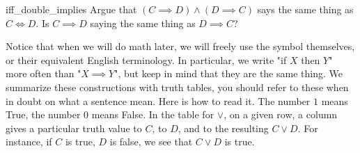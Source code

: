 \begin{cex}{}{iff_double_implies}
    Argue that \( (C \implies D) \land (D \implies C) \) says the same thing as \( C \iff D \). Is \( C \implies D \) saying the same thing as \(  D \implies C \)?
\end{cex}

Notice that when we will do math later, we will freely use the symbol themselves, or their equivalent English terminology. In particular, we write "if \( X \) then \( Y \)" more often than "\( X \implies Y \)", but keep in mind that they are the same thing. We summarize these constructions with truth tables, you should refer to these when in doubt on what a sentence mean. Here is how to read it. The number \( 1 \) means True, the number \( 0 \) means False. In the table for \( \lor \), on a given row, a column gives a particular truth value to \( C \), to \( D \), and to the resulting \( C \lor D \). For instance, if \( C \) is true, \( D \) is false, we see that \( C \lor D \) is true.  

